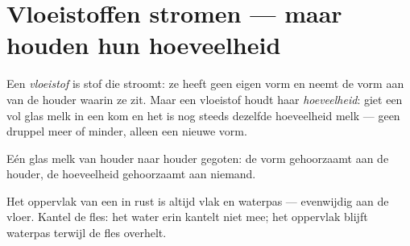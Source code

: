\section{Vloeistoffen stromen --- maar houden hun hoeveelheid}

\begin{definition}[Vloeistof]\label{def:g3:solids-liquids-gases:liquid}
Een \emph{vloeistof} is stof die stroomt: ze heeft
geen eigen vorm en neemt de vorm aan van de houder waarin ze zit. Maar
een vloeistof houdt haar \emph{hoeveelheid}: giet een vol glas melk in
een kom en het is nog steeds dezelfde hoeveelheid melk --- geen
druppel meer of minder, alleen een nieuwe vorm.
\end{definition}

\begin{omfigure}

{\small Eén glas melk van houder naar houder gegoten: de vorm
gehoorzaamt aan de houder, de hoeveelheid gehoorzaamt aan niemand.}
\end{omfigure}

\begin{proposition}\label{prop:g3:solids-liquids-gases:level}
Het oppervlak van een  in rust is altijd vlak en waterpas ---
evenwijdig aan de vloer. Kantel de fles: het water erin kantelt niet
mee; het oppervlak blijft waterpas terwijl de fles overhelt.
\end{proposition}

